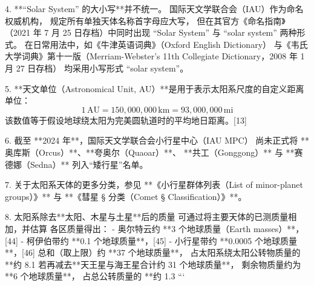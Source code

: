 4. **“Solar System” 的大小写**并不统一。  
   国际天文学联合会（IAU）作为命名权威机构，  
   规定所有单独天体名称首字母应大写，  
   但在其官方《命名指南》（2021 年 7 月 25 日存档）中同时出现  
   “Solar System” 与 “solar system” 两种形式。  
   在日常用法中，如《牛津英语词典》（Oxford English Dictionary）  
   与《韦氏大学词典》第十一版（Merriam-Webster’s 11th Collegiate Dictionary，2008 年 1 月 27 日存档）  
   均采用小写形式 “solar system”。  

5. **天文单位（Astronomical Unit, AU）**是用于表示太阳系尺度的自定义距离单位：  
   \[
   1\,\mathrm{AU} = 150,000,000\,\mathrm{km} = 93,000,000\,\mathrm{mi}
   \]
   该数值等于假设地球绕太阳为完美圆轨道时的平均地日距离。[13]  

6. 截至 **2024 年**，国际天文学联合会小行星中心（IAU MPC）  
   尚未正式将 **奥库斯（Orcus）**、**夸奥尔（Quaoar）**、  
   **共工（Gonggong）** 与 **赛德娜（Sedna）** 列入“矮行星”名单。  

7. 关于太阳系天体的更多分类，参见  
   **《小行星群体列表（List of minor-planet groups）》**  
   与 **《彗星 § 分类（Comet § Classification）》**。  

8. 太阳系除去**太阳、木星与土星**后的质量  
   可通过将主要天体的已测质量相加，并估算  
   各区质量得出：  
   - 奥尔特云约 **3 个地球质量（Earth masses）**，[44]  
   - 柯伊伯带约 **0.1 个地球质量**，[45]  
   - 小行星带约 **0.0005 个地球质量**，[46]  
   总和（取上限）约 **37 个地球质量**，  
   占太阳系绕太阳公转物质量的 **约 8.1%
   若再减去**天王星与海王星合计约 31 个地球质量**，  
   剩余物质量约为 **6 个地球质量**，  
   占总公转质量的 **约 1.3%
```
